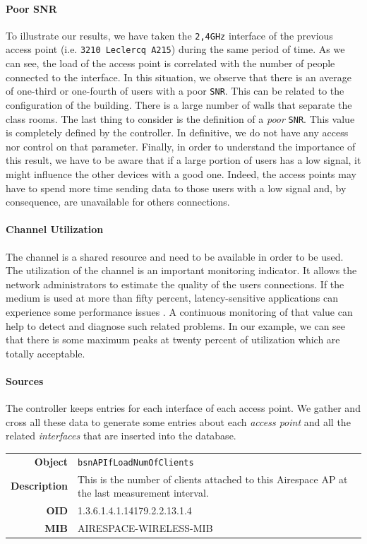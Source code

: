 \paragraph*{Poor SNR} To illustrate our results, we have taken the \texttt{2,4GHz} interface of the previous access point (i.e. \texttt{3210 Leclercq A215}) during the same period of time. As we can see, the load of the access point is correlated with the number of people connected to the interface. In this situation, we observe that there is an average of one-third or one-fourth of users with a poor \texttt{SNR}. This can be related to the configuration of the building. There is a large number of walls that separate the class rooms. The last thing to consider is the definition of a \emph{poor} \texttt{SNR}. This value is completely defined by the controller. In definitive, we do not have any access nor control on that parameter. Finally, in order to understand the importance of this result, we have to be aware that if a large portion of users has a low signal, it might influence the other devices with a good one. Indeed, the access points may have to spend more time sending data to those users with a low signal and, by consequence, are unavailable for others connections.

\paragraph*{Channel Utilization} The channel is a shared resource and need to be available in order to be used. The utilization of the channel is an important monitoring indicator. It allows the network administrators to estimate the quality of the users connections. If the medium is used at more than fifty percent, latency-sensitive applications can experience some performance issues \cite{ciscoVowlan}. A continuous monitoring of that value can help to detect and diagnose such related problems. In our example, we can see that there is some maximum peaks at twenty percent of utilization which are totally acceptable. 


\paragraph*{Sources} The controller keeps entries for each interface of each access point. We gather and cross all these data to generate some entries about each \emph{access point} and all the related \emph{interfaces} that are inserted into the database.

\begin{tabular}{|r l|}
\hline
\textbf{Object} & \texttt{bsnAPIfLoadNumOfClients} \\
\textbf{Description} & \parbox{11cm}{This is the number of clients attached to this Airespace AP at the last measurement interval.} \\
\textbf{OID} & 1.3.6.1.4.1.14179.2.2.13.1.4 \\
\textbf{MIB} & AIRESPACE-WIRELESS-MIB \\
\hline
\end{tabular}

